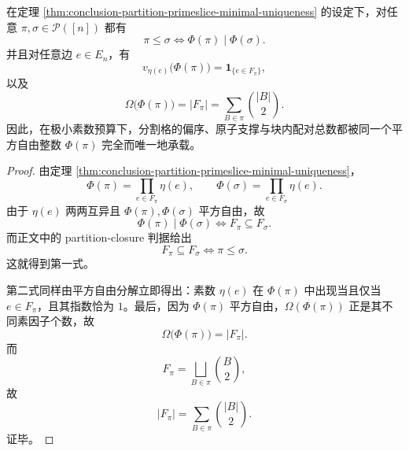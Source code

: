 \begin{corollary}\label{cor:conclusion-partition-primeslice-divisibility-valuation-paircount}
在定理 \ref{thm:conclusion-partition-primeslice-minimal-uniqueness} 的设定下，对任意 \(\pi,\sigma\in\mathcal P([n])\) 都有
\[
\pi\le \sigma
\iff
\Phi(\pi)\mid \Phi(\sigma).
\]
并且对任意边 \(e\in E_n\)，有
\[
v_{\eta(e)}\bigl(\Phi(\pi)\bigr)=\mathbf 1_{\{e\in F_\pi\}},
\]
以及
\[
\Omega\bigl(\Phi(\pi)\bigr)
=
|F_\pi|
=
\sum_{B\in\pi}\binom{|B|}{2}.
\]
因此，在极小素数预算下，分割格的偏序、原子支撑与块内配对总数都被同一个平方自由整数 \(\Phi(\pi)\) 完全而唯一地承载。
\end{corollary}
\begin{proof}
由定理 \ref{thm:conclusion-partition-primeslice-minimal-uniqueness}，
\[
\Phi(\pi)=\prod_{e\in F_\pi}\eta(e),
\qquad
\Phi(\sigma)=\prod_{e\in F_\sigma}\eta(e).
\]
由于 \(\eta(e)\) 两两互异且 \(\Phi(\pi),\Phi(\sigma)\) 平方自由，故
\[
\Phi(\pi)\mid \Phi(\sigma)
\iff
F_\pi\subseteq F_\sigma.
\]
而正文中的 partition-closure 判据给出
\[
F_\pi\subseteq F_\sigma
\iff
\pi\le \sigma.
\]
这就得到第一式。

第二式同样由平方自由分解立即得出：素数 \(\eta(e)\) 在 \(\Phi(\pi)\) 中出现当且仅当 \(e\in F_\pi\)，且其指数恰为 \(1\)。最后，因为 \(\Phi(\pi)\) 平方自由，\(\Omega(\Phi(\pi))\) 正是其不同素因子个数，故
\[
\Omega\bigl(\Phi(\pi)\bigr)=|F_\pi|.
\]
而
\[
F_\pi=\bigsqcup_{B\in\pi}\binom{B}{2},
\]
故
\[
|F_\pi|=\sum_{B\in\pi}\binom{|B|}{2}.
\]
证毕。
\end{proof}
